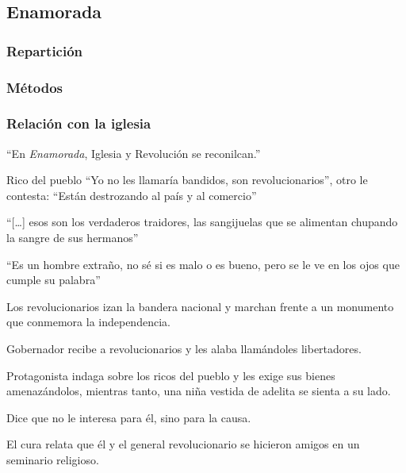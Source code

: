 \subsection{Enamorada}
\subsubsection{Repartición}
\subsubsection{Métodos}
\subsubsection{Relación con la iglesia}
    \begin{compactitem}
    \item ``En \emph{Enamorada}, Iglesia y Revolución se reconilcan.''\autocite[377]{sanchez_vi._2010}
    \item Rico del pueblo ``Yo no les llamaría bandidos, son revolucionarios'', otro le contesta: ``Están destrozando al país y al comercio''\autocite[5:31-5:46]{fernandez_enamorada_1946}
    \item ``[\ldots] esos son los verdaderos traidores, las sangijuelas que se alimentan chupando la sangre de sus hermanos''\autocite[14:11]{fernandez_enamorada_1946}
    \item ``Es un hombre extraño, no sé si es malo o es bueno, pero se le ve en los ojos que cumple su palabra''\autocite[39:00]{fernandez_enamorada_1946}
    \item Los revolucionarios izan la bandera nacional y marchan frente a un monumento que conmemora la independencia.\autocite[03:04]{fernandez_enamorada_1946}
    \item Gobernador recibe a revolucionarios y les alaba llamándoles libertadores.\autocite[3:52]{fernandez_enamorada_1946}
    \item Protagonista indaga sobre los ricos del pueblo y les exige sus bienes amenazándolos, mientras tanto, una niña vestida de adelita se sienta a su lado.\autocite[4:57-5:13]{fernandez_enamorada_1946}
    \begin{compactitem}
    \item Dice que no le interesa para él, sino para la causa.\autocite[21:38]{fernandez_enamorada_1946} 
    \end{compactitem}
    \item El cura relata que él y el general revolucionario se hicieron amigos en un seminario religioso.\autocite[4:57-5:13]{fernandez_enamorada_1946}

\end{compactitem}
